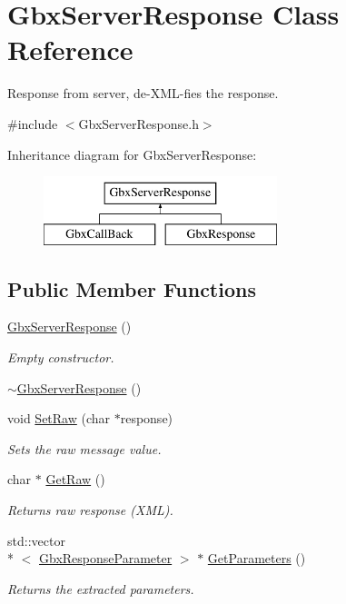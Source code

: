 \hypertarget{classGbxServerResponse}{\section{Gbx\-Server\-Response Class Reference}
\label{classGbxServerResponse}
}


Response from server, de-\/\-X\-M\-L-\/fies the response.  




{\ttfamily \#include $<$Gbx\-Server\-Response.\-h$>$}

Inheritance diagram for Gbx\-Server\-Response\-:\begin{figure}[H]
\begin{center}
\leavevmode
\includegraphics[height=2.000000cm]{classGbxServerResponse}
\end{center}
\end{figure}
\subsection*{Public Member Functions}
\begin{DoxyCompactItemize}
\item 
\hyperlink{classGbxServerResponse_a2198b6f6ca6b7da1ffd7bfa9a516d8b2}{Gbx\-Server\-Response} ()
\begin{DoxyCompactList}\small\item\em Empty constructor. \end{DoxyCompactList}\item 
\hyperlink{classGbxServerResponse_ad2a02192f5389a0fe10ea27cb24adedc}{$\sim$\-Gbx\-Server\-Response} ()
\item 
void \hyperlink{classGbxServerResponse_a1896da1a88aa07336829de953abe7364}{Set\-Raw} (char $\ast$response)
\begin{DoxyCompactList}\small\item\em Sets the raw message value. \end{DoxyCompactList}\item 
char $\ast$ \hyperlink{classGbxServerResponse_a3105f299a4f6a0d997f909415a467fd5}{Get\-Raw} ()
\begin{DoxyCompactList}\small\item\em Returns raw response (X\-M\-L). \end{DoxyCompactList}\item 
std\-::vector\\*
$<$ \hyperlink{classGbxResponseParameter}{Gbx\-Response\-Parameter} $>$ $\ast$ \hyperlink{classGbxServerResponse_ab791b8d9edb964b909d3c70753549668}{Get\-Parameters} ()
\begin{DoxyCompactList}\small\item\em Returns the extracted parameters. \end{DoxyCompactList}\end{DoxyCompactItemize}
